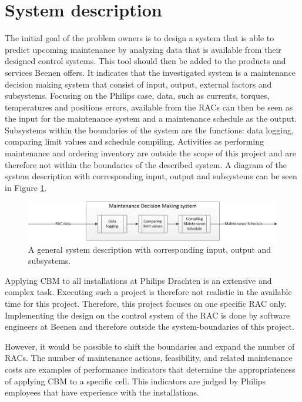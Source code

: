 \section{System description} \label{System description}
The initial goal of the problem owners is to design a system that is able to predict upcoming maintenance by analyzing data that is available from their designed control systems. This tool should then be added to the products and services Beenen offers. It indicates that the investigated system is a maintenance decision making system that consist of input, output, external factors and subsystems. Focusing on the Philips case, data, such as currents, torques, temperatures and positions errors, available from the RACs can then be seen as the input for the maintenance system and a maintenance schedule as the output. Subsystems within the boundaries of the system are the functions: data logging, comparing limit values and schedule compiling. Activities as performing maintenance and ordering inventory are outside the scope of this project and are therefore not within the boundaries of the described system. A diagram of the system description with corresponding input, output and subsystems can be seen in Figure \ref{fig:System_Description}. 
\begin{figure}[ht]
\centering
\includegraphics[width=\textwidth]{Figures/Intended_System_Description}
\caption[General system description]{A general system description with corresponding input, output and subsystems.}
\label{fig:System_Description}
\end{figure} 

Applying CBM to all installations at Philips Drachten is an extensive and complex task. Executing such a project is therefore not realistic in the available time for this project. Therefore, this project focuses on one specific RAC only. Implementing the design on the control system of the RAC is done by software engineers at Beenen and therefore outside the system-boundaries of this project. 

However, it would be possible to shift the boundaries and expand the number of RACs. The number of maintenance actions, feasibility, and related maintenance costs are examples of performance indicators that determine the appropriateness of applying CBM to a specific cell. This indicators are judged by Philips employees that have experience with the installations.

